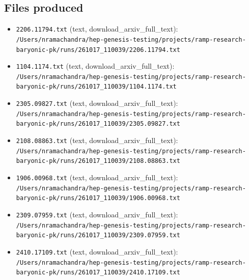 \documentclass[11pt,a4paper]{article}
\begin{document}
\subsection{Files produced}
\begin{itemize}
  \item \texttt{2206.11794.txt} (text, download\_arxiv\_full\_text): \texttt{/\allowbreak{}Users/\allowbreak{}nramachandra/\allowbreak{}hep-genesis-testing/\allowbreak{}projects/\allowbreak{}ramp-research-baryonic-pk/\allowbreak{}runs/\allowbreak{}261017\_\allowbreak{}110039/\allowbreak{}2206.11794.txt}
  \item \texttt{1104.1174.txt} (text, download\_arxiv\_full\_text): \texttt{/\allowbreak{}Users/\allowbreak{}nramachandra/\allowbreak{}hep-genesis-testing/\allowbreak{}projects/\allowbreak{}ramp-research-baryonic-pk/\allowbreak{}runs/\allowbreak{}261017\_\allowbreak{}110039/\allowbreak{}1104.1174.txt}
  \item \texttt{2305.09827.txt} (text, download\_arxiv\_full\_text): \texttt{/\allowbreak{}Users/\allowbreak{}nramachandra/\allowbreak{}hep-genesis-testing/\allowbreak{}projects/\allowbreak{}ramp-research-baryonic-pk/\allowbreak{}runs/\allowbreak{}261017\_\allowbreak{}110039/\allowbreak{}2305.09827.txt}
  \item \texttt{2108.08863.txt} (text, download\_arxiv\_full\_text): \texttt{/\allowbreak{}Users/\allowbreak{}nramachandra/\allowbreak{}hep-genesis-testing/\allowbreak{}projects/\allowbreak{}ramp-research-baryonic-pk/\allowbreak{}runs/\allowbreak{}261017\_\allowbreak{}110039/\allowbreak{}2108.08863.txt}
  \item \texttt{1906.00968.txt} (text, download\_arxiv\_full\_text): \texttt{/\allowbreak{}Users/\allowbreak{}nramachandra/\allowbreak{}hep-genesis-testing/\allowbreak{}projects/\allowbreak{}ramp-research-baryonic-pk/\allowbreak{}runs/\allowbreak{}261017\_\allowbreak{}110039/\allowbreak{}1906.00968.txt}
  \item \texttt{2309.07959.txt} (text, download\_arxiv\_full\_text): \texttt{/\allowbreak{}Users/\allowbreak{}nramachandra/\allowbreak{}hep-genesis-testing/\allowbreak{}projects/\allowbreak{}ramp-research-baryonic-pk/\allowbreak{}runs/\allowbreak{}261017\_\allowbreak{}110039/\allowbreak{}2309.07959.txt}
  \item \texttt{2410.17109.txt} (text, download\_arxiv\_full\_text): \texttt{/\allowbreak{}Users/\allowbreak{}nramachandra/\allowbreak{}hep-genesis-testing/\allowbreak{}projects/\allowbreak{}ramp-research-baryonic-pk/\allowbreak{}runs/\allowbreak{}261017\_\allowbreak{}110039/\allowbreak{}2410.17109.txt}

\end{itemize}
\end{document}
